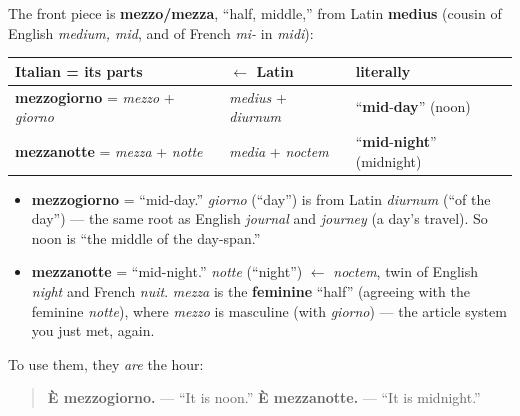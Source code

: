 \begin{cousinweb}
The front piece is \textbf{mezzo/mezza}, \textquotedblleft{}half, middle,\textquotedblright{} from Latin \textbf{medius} (cousin of English \emph{medium, mid}, and of French \emph{mi-} in \emph{midi}):

\noindent
\begin{tabularx}{\linewidth}{@{}>{\raggedright\arraybackslash}X>{\raggedright\arraybackslash}X>{\raggedright\arraybackslash}X@{}}
\toprule
\textbf{Italian = its parts} & \textbf{$\leftarrow$ Latin} & \textbf{literally} \\
\midrule
\textbf{mezzogiorno} = \emph{mezzo} + \emph{giorno} & \emph{medius} + \emph{diurnum} & \textquotedblleft{}\textbf{mid}-\textbf{day}\textquotedblright{} (noon) \\
\textbf{mezzanotte} = \emph{mezza} + \emph{notte} & \emph{media} + \emph{noctem} & \textquotedblleft{}\textbf{mid}-\textbf{night}\textquotedblright{} (midnight) \\
\bottomrule
\end{tabularx}

\begin{itemize}
\raggedright
  \item \textbf{mezzogiorno} = \textquotedblleft{}mid-day.\textquotedblright{} \emph{giorno} (\textquotedblleft{}day\textquotedblright{}) is from Latin \emph{diurnum} (\textquotedblleft{}of the day\textquotedblright{}) — the same root as English \emph{journal} and \emph{journey} (a day's travel). So noon is \textquotedblleft{}the middle of the day-span.\textquotedblright{}
  \item \textbf{mezzanotte} = \textquotedblleft{}mid-night.\textquotedblright{} \emph{notte} (\textquotedblleft{}night\textquotedblright{}) $\leftarrow$ \emph{noctem}, twin of English \emph{night} and French \emph{nuit}. \emph{mezza} is the \textbf{feminine} \textquotedblleft{}half\textquotedblright{} (agreeing with the feminine \emph{notte}), where \emph{mezzo} is masculine (with \emph{giorno}) — the article system you just met, again.
\end{itemize}

To use them, they \emph{are} the hour:

\begin{quote}
\textbf{È mezzogiorno.} — \textquotedblleft{}It is noon.\textquotedblright{} \textbf{È mezzanotte.} — \textquotedblleft{}It is midnight.\textquotedblright{}
\end{quote}
\end{cousinweb}


